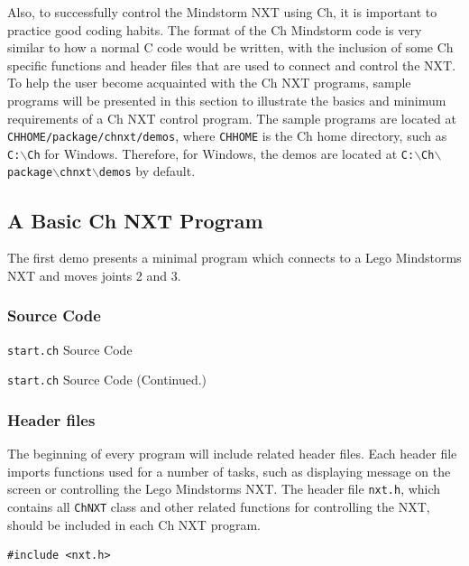 \documentclass[11pt]{article}
\begin{document}
\noindent
Also, to successfully control the Mindstorm NXT using Ch, it is important to practice good coding habits. 
The format of the Ch Mindstorm code is very similar to how a normal C code would be written, with the
inclusion of some Ch specific functions and header files that are used to connect and control the NXT. To 
help the user become acquainted with the Ch NXT programs, sample programs will be presented in this 
section to illustrate the basics and minimum requirements of a Ch NXT control program. The sample programs
are located at \texttt{CHHOME/package/chnxt/demos}, where \texttt{CHHOME} is the Ch home directory, such as
\texttt{C:$\backslash$Ch} for Windows. Therefore, for Windows, the demos are located at 
\texttt{C:$\backslash$Ch$\backslash$package$\backslash$chnxt$\backslash$demos} by default.

\subsection{\label{sec:basic_demo}A Basic Ch NXT Program}
The first demo presents a minimal program which connects to a Lego Mindstorms NXT and moves joints 2 and 3.

\subsubsection*{Source Code}

\begin{Program}[H]
    {\small}
    \caption{\texttt{start.ch} Source Code\label{prog_start.ch}}
\end{Program}
\addtocounter{Program}{-1}
\begin{Program}[H]
    {\small}
    \caption{\texttt{start.ch} Source Code (Continued.)\label{prog_start.ch}}
\end{Program}

\subsubsection*{Header files}
The beginning of every program will include related header files. Each header file imports functions used for
a number of tasks, such as displaying message on the screen or controlling the Lego Mindstorms NXT. The header
file \texttt{nxt.h}, which contains all \texttt{ChNXT} class and other related functions for controlling the NXT, 
should be included in each Ch NXT program.
\begin{verbatim}
#include <nxt.h>
\end{verbatim}
\end{document}
